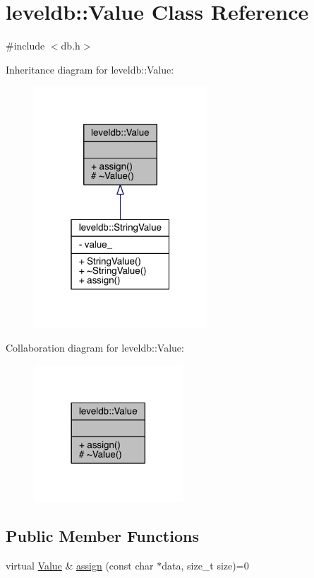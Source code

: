 \hypertarget{classleveldb_1_1_value}{}\section{leveldb\+:\+:Value Class Reference}
\label{classleveldb_1_1_value}


{\ttfamily \#include $<$db.\+h$>$}



Inheritance diagram for leveldb\+:\+:Value\+:\nopagebreak
\begin{figure}[H]
\begin{center}
\leavevmode
\includegraphics[width=184pt]{classleveldb_1_1_value__inherit__graph}
\end{center}
\end{figure}


Collaboration diagram for leveldb\+:\+:Value\+:\nopagebreak
\begin{figure}[H]
\begin{center}
\leavevmode
\includegraphics[width=158pt]{classleveldb_1_1_value__coll__graph}
\end{center}
\end{figure}
\subsection*{Public Member Functions}
\begin{DoxyCompactItemize}
\item 
virtual \hyperlink{classleveldb_1_1_value}{Value} \& \hyperlink{classleveldb_1_1_value_ac992abccdbb453f5c0ca233e56f9aa9f}{assign} (const char $\ast$data, size\+\_\+t size)=0
\end{DoxyCompactItemize}
